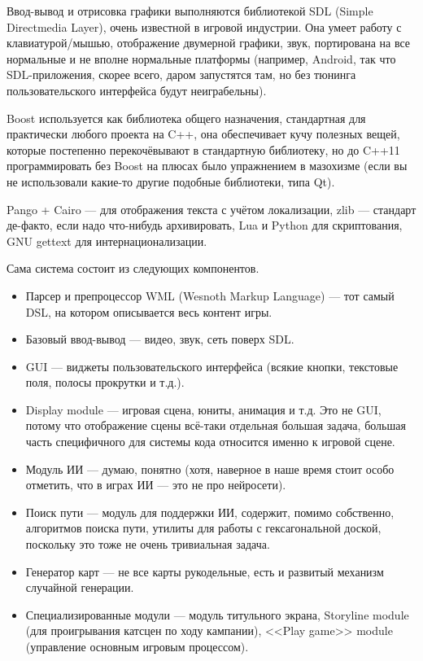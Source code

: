 \documentclass[a5paper]{article}
\begin{document}
Ввод-вывод и отрисовка графики выполняются библиотекой SDL (Simple Directmedia Layer), очень известной в игровой индустрии. Она умеет работу с клавиатурой/мышью, отображение двумерной графики, звук, портирована на все нормальные и не вполне нормальные платформы (например, Android, так что SDL-приложения, скорее всего, даром запустятся там, но без тюнинга пользовательского интерфейса будут неиграбельны).

Boost используется как библиотека общего назначения, стандартная для практически любого проекта на C++, она обеспечивает кучу полезных вещей, которые постепенно перекочёвывают в стандартную библиотеку, но до C++11 программировать без Boost на плюсах было упражнением в мазохизме (если вы не использовали какие-то другие подобные библиотеки, типа Qt).

Pango + Cairo --- для отображения текста с учётом локализации, zlib --- стандарт де-факто, если надо что-нибудь архивировать, Lua и Python для скриптования, GNU gettext для интернационализации.

Сама система состоит из следующих компонентов.

\begin{itemize}
    \item Парсер и препроцессор WML (Wesnoth Markup Language) --- тот самый DSL, на котором описывается весь контент игры.
    \item Базовый ввод-вывод --- видео, звук, сеть поверх SDL.
    \item GUI --- виджеты пользовательского интерфейса (всякие кнопки, текстовые поля, полосы прокрутки и т.д.).
    \item Display module --- игровая сцена, юниты, анимация и т.д. Это не GUI, потому что отображение сцены всё-таки отдельная большая задача, большая часть специфичного для системы кода относится именно к игровой сцене.
    \item Модуль ИИ --- думаю, понятно (хотя, наверное в наше время стоит особо отметить, что в играх ИИ --- это не про нейросети).
    \item Поиск пути --- модуль для поддержки ИИ, содержит, помимо собственно, алгоритмов поиска пути, утилиты для работы с гексагональной доской, поскольку это тоже не очень тривиальная задача.
    \item Генератор карт --- не все карты рукодельные, есть и развитый механизм случайной генерации.
    \item Специализированные модули --- модуль титульного экрана, Storyline module (для проигрывания катсцен по ходу кампании), <<Play game>> module (управление основным игровым процессом).
\end{itemize}
\end{document}
